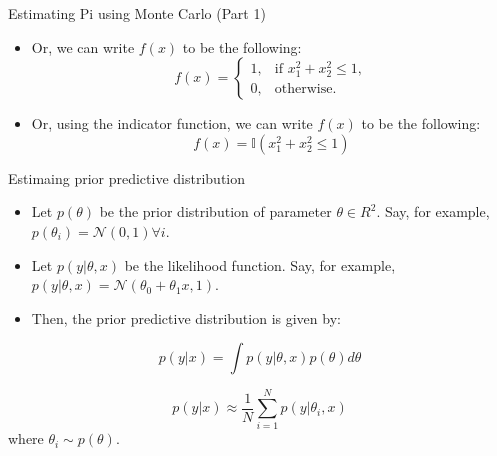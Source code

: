 \documentclass[handout]{beamer}
\begin{document}
\begin{frame}[fragile]{Estimating Pi using Monte Carlo (Part 1)}

    \begin{itemize}
    \item Or, we can write $f(x)$ to be the following:
        \[
        f(x) = \begin{cases}
                    1, & \text{if } x_1^2 + x_2^2 \leq 1, \\
                    0, & \text{otherwise}.
               \end{cases}
        \]
    \item Or, using the indicator function, we can write $f(x)$ to be the following:
        \[
        f(x) = \mathbb{I}(x_1^2 + x_2^2 \leq 1)
        \]
    \end{itemize}
    
    \begin{center}
    \end{center}
    \end{frame}

    \begin{frame}{Estimaing prior predictive distribution}
        \begin{itemize}
            \item Let $p(\theta)$ be the prior distribution of parameter $\theta \in R^2$. Say, for example, $p(\theta_i) = \mathcal{N}(0, 1) \forall i$.
            \item Let $p(y |\theta, x)$ be the likelihood function. Say, for example, $p(y|\theta, x) = \mathcal{N}(\theta_0 + \theta_1 x, 1)$.
            \item Then, the prior predictive distribution is given by:
        \end{itemize}

            \begin{equation}
                p(y|x) = \int p(y|\theta, x) p(\theta) d\theta 
            \end{equation}

            \begin{equation}
                p(y|x) \approx \frac{1}{N} \sum_{i=1}^{N} p(y|\theta_i, x)
            \end{equation}
            where $\theta_i \sim p(\theta)$.
    \end{frame}
\end{document}
